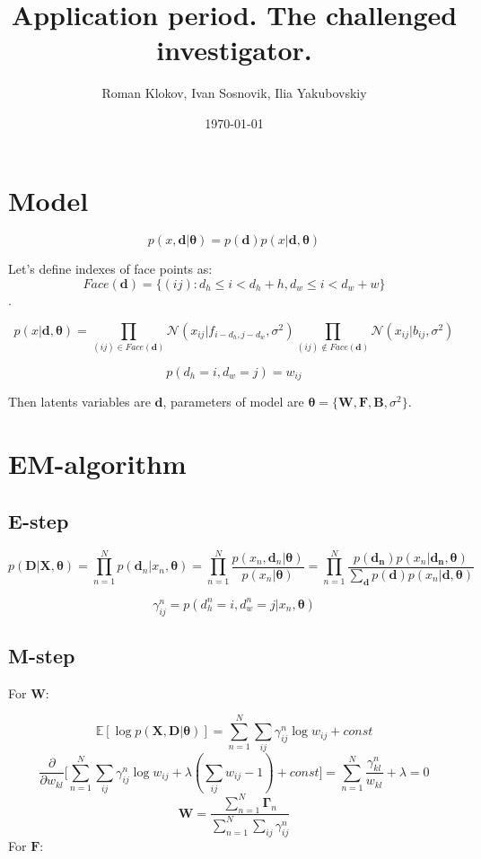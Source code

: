 \documentclass[12pt]{article}
\title{\textbf{Application period. The challenged investigator.}}
\author{Roman Klokov, Ivan Sosnovik, Ilia Yakubovskiy}
\date{\today}
\begin{document}
\maketitle

\section{Model}

$$p(x, \mathbf{d}|\boldsymbol{\theta}) =  p(\mathbf{d})p(x|\mathbf{d}, \boldsymbol{\theta})$$

Let's define indexes of face points as: 
$$Face(\mathbf{d}) = \{(ij): d_h \leq i < d_h + h, d_w \leq i < d_w + w\}$$.

$$p(x|\mathbf{d}, \boldsymbol{\theta}) = \prod_{(ij) \in Face(\mathbf{d})} \mathcal{N}(x_{ij}|f_{i-d_h, j-d_w}, \sigma^2) \prod_{(ij) \notin Face(\mathbf{d})} \mathcal{N}(x_{ij}|b_{ij}, \sigma^2)$$

$$p(d_h = i, d_w = j) = w_{ij}$$

Then latents variables are $\mathbf{d}$, parameters of model are $\boldsymbol{\theta} = \{\mathbf{W}, \mathbf{F}, \mathbf{B}, \sigma^2\}$.

\section{EM-algorithm}
\subsection{E-step}

$$p(\mathbf{D}|\mathbf{X}, \boldsymbol{\theta}) = \prod_{n=1}^N p(\mathbf{d}_n|x_n, \boldsymbol{\theta}) = \prod_{n=1}^N \frac{p(x_n, \mathbf{d}_n| \boldsymbol{\theta})}{p(x_n|\boldsymbol{\theta})} = \prod_{n=1}^N \frac{p(\mathbf{d_n})p(x_n|\mathbf{d_n}, \boldsymbol{\theta})}{\sum\limits_{\mathbf{d}}p(\mathbf{d})p(x_n|\mathbf{d}, \boldsymbol{\theta})}$$

$$\gamma^n_{ij} = p(d^n_h = i, d^n_w = j|x_n, \boldsymbol{\theta})$$

\subsection{M-step}

For $\mathbf{W}$:

$$\mathbb{E}[\log p(\mathbf{X}, \mathbf{D}|\boldsymbol{\theta})] = \sum_{n=1}^N \sum_{ij} \gamma^n_{ij} \log w_{ij} + \mathit{const}$$
$$\frac{\partial}{\partial w_{kl}} \Big[\sum_{n=1}^N \sum_{ij} \gamma^n_{ij} \log w_{ij} + \lambda (\sum_{ij} w_{ij} - 1) + \mathit{const}\Big] = \sum_{n=1}^N \frac{\gamma^n_{kl}}{w_{kl}} + \lambda = 0$$
$$\mathbf{W} = \frac{\sum\limits_{n=1}^N\boldsymbol{\Gamma}_n}{\sum\limits_{n=1}^N\sum\limits_{ij}\gamma^n_{ij}}$$
\noindent
For $\mathbf{F}$:
\end{document}

